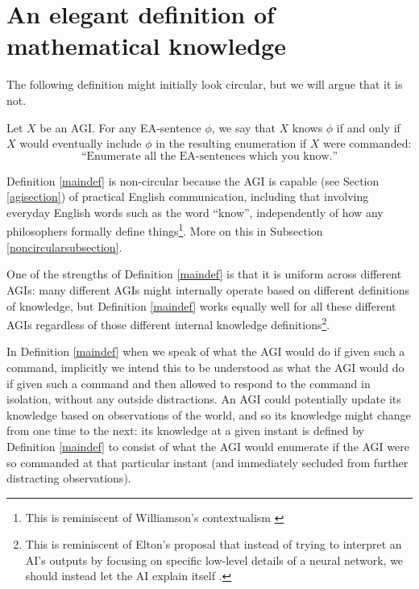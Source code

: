 \documentclass[runningheads]{llncs}
\begin{document}
\section{An elegant definition of mathematical knowledge}
\label{mainsection}

The following definition might initially look circular, but we will argue that
it is not.

\begin{definition}
\label{maindef}
  Let $X$ be an AGI.
  For any EA-sentence $\phi$, we say that $X$
  knows $\phi$ if and only
  if $X$ would eventually include $\phi$ in the resulting enumeration
  if $X$ were commanded:
  \[
  \text{``Enumerate all the EA-sentences which you know.''}
  \]
\end{definition}

Definition \ref{maindef} is non-circular because
the AGI is capable (see Section \ref{agisection}) of practical English
communication, including that involving everyday English words such as
the word ``know'', independently of how any philosophers formally
define things\footnote{This is reminiscent of
Williamson's contextualism \cite{williamson2005knowledge}}.
More on this in Subsection \ref{noncircularsubsection}.


One of the strengths of Definition \ref{maindef} is that it is uniform across
different AGIs: many different AGIs might internally operate based on different
definitions of knowledge, but Definition \ref{maindef} works equally well for
all these different AGIs regardless of those different internal knowledge
definitions\footnote{This is reminiscent of Elton's proposal that instead of
trying to interpret an AI's outputs by focusing on specific low-level details
of a neural network, we should instead let the AI explain itself \cite{elton}.}.

\begin{remark}
In Definition \ref{maindef} when we speak of what the AGI would do
if given such a command, implicitly we intend this to be understood as what
the AGI would do if given such a command and then allowed to respond to the
command in isolation, without any outside distractions. An AGI could potentially
update its knowledge based on observations of the world, and so its knowledge
might change from one time to the next: its knowledge at a given instant is defined
by Definition \ref{maindef} to consist of what the AGI would enumerate if the
AGI were so commanded at that particular instant (and immediately secluded from
further distracting observations).
\end{remark}
\end{document}
